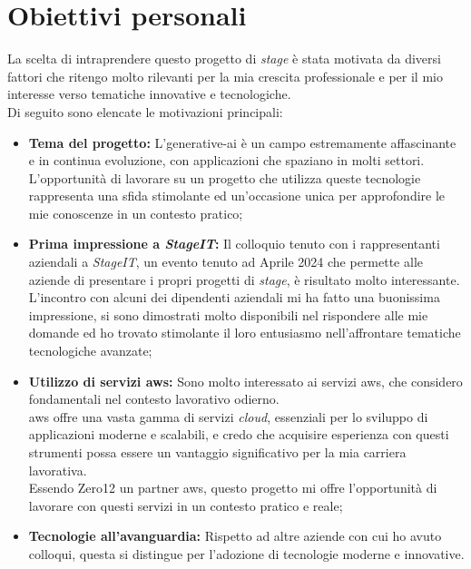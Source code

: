 \section{Obiettivi personali}
\label{sez:obiettivi-personali}

La scelta di intraprendere questo progetto di \textit{stage} è stata motivata da diversi fattori che ritengo molto rilevanti per la mia crescita professionale e per il mio interesse verso tematiche innovative e tecnologiche.\\

\noindent Di seguito sono elencate le motivazioni principali:

\begin{itemize}
    \item \textbf{Tema del progetto:} L'\gls{generative-ai} è un campo estremamente affascinante e in continua evoluzione, con applicazioni che spaziano in molti settori.\\
    L'opportunità di lavorare su un progetto che utilizza queste tecnologie rappresenta una sfida stimolante ed un'occasione unica per approfondire le mie conoscenze in un contesto pratico;
    \item \textbf{Prima impressione a \textit{StageIT}:} Il colloquio tenuto con i rappresentanti aziendali a \textit{StageIT}, un evento tenuto ad Aprile 2024 che permette alle aziende di presentare i propri progetti di \textit{stage}, è risultato molto interessante. \\
    L'incontro con alcuni dei dipendenti aziendali mi ha fatto una buonissima impressione, si sono dimostrati molto disponibili nel rispondere alle mie domande ed ho trovato stimolante il loro entusiasmo nell'affrontare tematiche tecnologiche avanzate;
    \item \textbf{Utilizzo di servizi \gls{aws}:} Sono molto interessato ai servizi \gls{aws}, che considero fondamentali nel contesto lavorativo odierno. \\
    \gls{aws} offre una vasta gamma di servizi \textit{cloud}, essenziali per lo sviluppo di applicazioni moderne e scalabili, e credo che acquisire esperienza con questi strumenti possa essere un vantaggio significativo per la mia carriera lavorativa.\\
    Essendo Zero12 un partner \gls{aws}, questo progetto mi offre l'opportunità di lavorare con questi servizi in un contesto pratico e reale;
    \item \textbf{Tecnologie all'avanguardia:} Rispetto ad altre aziende con cui ho avuto colloqui, questa si distingue per l'adozione di tecnologie moderne e innovative. \\

\end{itemize}
